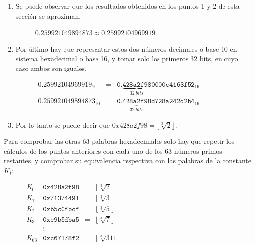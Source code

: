 \documentclass{article}
\begin{document}
\begin{enumerate}
            \item Se puede observar que los resultados obtenidos en los puntos 1 y 2 de esta sección se aproximan.
                \begin{figure}[H]
                \centering
                    $0.259921049894873 \approx 0.25992104969919$
                \end{figure}
            
            \item Por último hay que representar estos dos números decimales o base 10 en sistema hexadecimal o base 16, y tomar solo los primeros 32 bits, en cuyo caso ambos son iguales.
                \begin{figure}[H]
                \centering
                    $\begin{array}{lcl}
                    0.25992104969919_{10} & = & \texttt{0.}\underbrace{\texttt{428a2f98}}_{32 \ bits}\texttt{0000c4163f52}_{16} \\
                    0.259921049894873_{10} & = & \texttt{0.}\underbrace{\texttt{428a2f98}}_{32 \ bits}\texttt{d728a242d2b4}_{16}
                    \end{array}$
                \end{figure}
            
            \item Por lo tanto se puede decir que $0x428a2f98 = \lfloor \sqrt[3]{2} \rfloor$.
            \vspace{3mm}
        \end{enumerate}
        
        Para comprobar las otras 63 palabras hexadecimales solo hay que repetir los cálculos de los puntos anteriores con cada uno de los 63 números primos restantes, y comprobar su equivalencia respectiva con las palabras de la constante $K_{t}$:
            \begin{figure}[H]
            \centering
                $\begin{array}{lccl}
                    K_{0} & \texttt{0x428a2f98} & = & \lfloor \sqrt[3]{2} \rfloor \\
                        K_{1} & \texttt{0x71374491} & = & \lfloor \sqrt[3]{3} \rfloor \\
                    K_{2} & \texttt{0xb5c0fbcf} & = & \lfloor \sqrt[3]{5} \rfloor \\
                    K_{3} & \texttt{0xe9b5dba5} & = & \lfloor \sqrt[3]{7} \rfloor \\
                    & \vdots & \\
                    K_{63} & \texttt{0xc67178f2} & = & \lfloor \sqrt[3]{311} \rfloor
                \end{array}$
            \end{figure}
\end{document}
